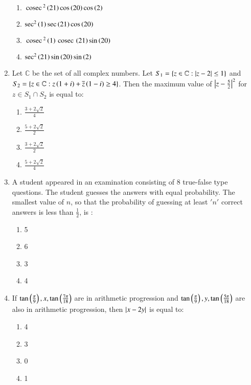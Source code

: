 \documentclass[journal]{IEEEtran}
\begin{document}
\begin{enumerate}
 \begin{enumerate}
     \item $\,\text{cosec}\,^{2}\left(21\right)\cos\left(20\right)\cos\left(2\right)$
     \item $\sec^{2}\left(1\right)\sec\left(21\right)\cos\left(20\right)$
     \item $\,\text{cosec}\,^{2}\left(1\right)\,\text{cosec}\,\left(21\right)\sin\left(20\right)$
     \item $\sec^{2}\left(21\right)\sin\left(20\right)\sin\left(2\right)$\\
 \end{enumerate}
\item Let $\mathbb{C}$ be the set of all complex numbers. Let $S_1 = \left\{z\in\mathbb{C}:\left\vert z-2\right\vert \leq 1\right\}$ and $S_2 = \left\{z\in\mathbb{C}:z\left(1+i\right) + \overline{z}\left(1-i\right) \geq 4\right\}$. Then the maximum value of $\left\vert z-\frac{5}{2}\right\vert^{2}$ for $z \in S_1 \cap S_2$ is equal to:
\begin{enumerate}
    \item $\frac{3 + 2\sqrt{2}}{4}$
    \item $\frac{5 + 2\sqrt{2}}{2}$
    \item $\frac{3 + 2\sqrt{2}}{2}$
    \item $\frac{5 + 2\sqrt{2}}{4}$\\
\end{enumerate}
\item  A student appeared in an examination consisting of 8 true-false type questions. The student guesses the answers with equal probability. The smallest value of $n$, so that the probability of guessing at least $'n'$ correct answers is less than $\frac{1}{2}$, is :
\begin{enumerate}
    \item 5
    \item 6
    \item 3
    \item 4 \\
\end{enumerate}
\item If $\tan\left(\frac{\pi}{9}\right), x, \tan\left(\frac{7\pi}{18}\right)$ are in arithmetic progression and $\tan\left(\frac{\pi}{9}\right), y, \tan\left(\frac{5\pi}{18}\right)$ are also in arithmetic progression, then $\left\vert x - 2y\right\vert$ is equal to:
\begin{enumerate}
    \item 4
    \item 3
    \item 0
    \item 1\\
\end{enumerate}

\end{enumerate}
\end{document}

